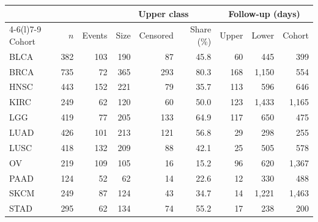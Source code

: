 \begin{tabular}{@{}l rrr rr rrr@{}}
\toprule
 &  &  & \multicolumn{3}{c}{Upper class} & \multicolumn{3}{c}{Follow-up (days)} \\
\cmidrule(lr){4-6}\cmidrule(l){7-9}
Cohort & $n$ & Events & Size & Censored & Share (\%) & Upper & Lower & Cohort \\
\midrule
BLCA & 382 & 103 & 190 & 87 & 45.8 & 60 & 445 & 399 \\
BRCA & 735 & 72 & 365 & 293 & 80.3 & 168 & 1{,}150 & 554 \\
HNSC & 443 & 152 & 221 & 79 & 35.7 & 113 & 596 & 646 \\
KIRC & 249 & 62 & 120 & 60 & 50.0 & 123 & 1{,}433 & 1{,}165 \\
LGG & 419 & 77 & 205 & 133 & 64.9 & 117 & 650 & 475 \\
LUAD & 426 & 101 & 213 & 121 & 56.8 & 29 & 298 & 255 \\
LUSC & 418 & 132 & 209 & 88 & 42.1 & 25 & 505 & 578 \\
OV & 219 & 109 & 105 & 16 & 15.2 & 96 & 620 & 1{,}367 \\
PAAD & 124 & 52 & 62 & 14 & 22.6 & 12 & 330 & 488 \\
SKCM & 249 & 87 & 124 & 43 & 34.7 & 14 & 1{,}221 & 1{,}463 \\
STAD & 295 & 62 & 134 & 74 & 55.2 & 17 & 238 & 200 \\
\bottomrule
\end{tabular}
